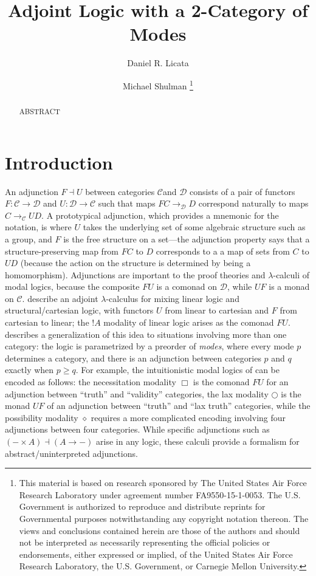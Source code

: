 \documentclass{drl-common/llncs}
\title{Adjoint Logic with a 2-Category of Modes}
\author{Daniel R. Licata\inst{1} \and Michael Shulman\inst{2}
\thanks{
This material is based on research sponsored by The United States Air
Force Research Laboratory under agreement number FA9550-15-1-0053. The
U.S. Government is authorized to reproduce and distribute reprints for
Governmental purposes notwithstanding any copyright notation thereon.
The views and conclusions contained herein are those of the authors and
should not be interpreted as necessarily representing the official
policies or endorsements, either expressed or implied, of the United
States Air Force Research Laboratory, the U.S. Government, or Carnegie
Mellon University.
}}
\institute{Wesleyan University \and University of San Diego}
\begin{document}
\maketitle

\begin{abstract}
ABSTRACT
\end{abstract}

\newcommand{\C}{\ensuremath{\mathcal{C}}}
\newcommand{\D}{\ensuremath{\mathcal{D}}}
\newcommand{\la}{\ensuremath{\dashv}}
\newcommand{\arrow}[3]{\ensuremath{#2 \longrightarrow_{#1} #3}}
\newcommand{\sh}{\text{\textesh}}

\section{Introduction}

An adjunction $F \la U$ between categories \C and \D\/ consists of a
pair of functors $F : \C \to \D$ and $U : \D \to \C$ such that maps
\arrow{\D}{F C}{D} correspond naturally to maps \arrow{\C}{C}{U D}.  A
prototypical adjunction, which provides a mnemonic for the notation, is
where $U$ takes the underlying set of some algebraic structure such as a
group, and $F$ is the free structure on a set---the adjunction property
says that a structure-preserving map from $F C$ to $D$ corresponds to a
a map of sets from $C$ to $U D$ (because the action on the structure is
determined by being a homomorphism).  Adjunctions are important to the
proof theories and $\lambda$-calculi of modal logics, because the
composite $FU$ is a comonad on \D, while $UF$ is a monad on $\C$.
\citet{bentonwadler96adjoint} describe an adjoint $\lambda$-calculus for
mixing linear logic and structural/cartesian logic, with functors $U$
from linear to cartesian and $F$ from cartesian to linear; the $! A$
modality of linear logic arises as the comonad $FU$.
\citet{reed09adjoint} describes a generalization of this idea to
situations involving more than one category: the logic is parametrized
by a preorder of \emph{modes}, where every mode $p$ determines a
category, and there is an adjunction between categories $p$ and $q$
exactly when $p \ge q$.  For example, the intuitionistic modal logics of
\citet{pfenningdavies} can be encoded as follows: the necessitation
modality $\Box$ is the comonad $FU$ for an adjunction between ``truth''
and ``validity'' categories, the lax modality $\bigcirc$ is the monad
$UF$ of an adjunction between ``truth'' and ``lax truth'' categories,
while the possibility modality $\diamond$ requires a more complicated
encoding involving four adjunctions between four categories.  While
specific adjunctions such as $(- \times A) \la (A \to -)$ arise in any
logic, these calculi provide a formalism for abstract/uninterpreted
adjunctions.
\end{document}
